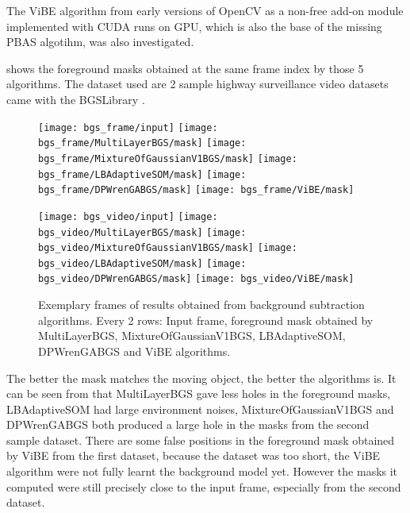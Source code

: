 
The ViBE algorithm from early versions of OpenCV as a non-free add-on module implemented with CUDA runs on GPU, which is also the base of the missing PBAS algotihm, was also investigated.

 shows the foreground masks obtained at the same frame index by those 5 algorithms. The dataset used are 2 sample highway surveillance video datasets came with the BGSLibrary \cite{bgslibrary}.

\begin{figure}[htb]
  \centering
  \texttt{[image: bgs\_frame/input]}
  \texttt{[image: bgs\_frame/MultiLayerBGS/mask]}
  \texttt{[image: bgs\_frame/MixtureOfGaussianV1BGS/mask]}
  \texttt{[image: bgs\_frame/LBAdaptiveSOM/mask]}
  \texttt{[image: bgs\_frame/DPWrenGABGS/mask]}
  \texttt{[image: bgs\_frame/ViBE/mask]}


  \texttt{[image: bgs\_video/input]}
  \texttt{[image: bgs\_video/MultiLayerBGS/mask]}
  \texttt{[image: bgs\_video/MixtureOfGaussianV1BGS/mask]}
  \texttt{[image: bgs\_video/LBAdaptiveSOM/mask]}
  \texttt{[image: bgs\_video/DPWrenGABGS/mask]}
  \texttt{[image: bgs\_video/ViBE/mask]}

  \caption{Exemplary frames of results obtained from background subtraction algorithms. Every 2 rows: Input frame, foreground mask obtained by MultiLayerBGS, MixtureOfGaussianV1BGS, LBAdaptiveSOM, DPWrenGABGS and ViBE algorithms.}
  \label{Figure:bgs_frame}
\end{figure}


The better the mask matches the moving object, the better the algorithms is. It can be seen from  that MultiLayerBGS gave less holes in the foreground masks, LBAdaptiveSOM had large environment noises, MixtureOfGaussianV1BGS and DPWrenGABGS both produced a large hole in the masks from the second sample dataset. There are some false positions in the foreground mask obtained by ViBE from the first dataset, because the dataset was too short, the ViBE algorithm were not fully learnt the background model yet. However the masks it computed were still precisely close to the input frame, especially from the second dataset.

